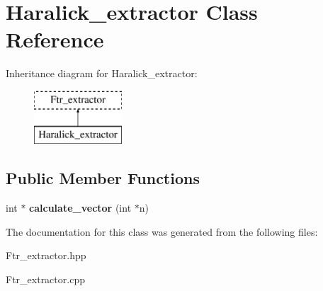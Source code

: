 \hypertarget{class_haralick__extractor}{\section{Haralick\+\_\+extractor Class Reference}
\label{class_haralick__extractor}
}
Inheritance diagram for Haralick\+\_\+extractor\+:\begin{figure}[H]
\begin{center}
\leavevmode
\includegraphics[height=2.000000cm]{class_haralick__extractor}
\end{center}
\end{figure}
\subsection*{Public Member Functions}
\begin{DoxyCompactItemize}
\item 
\hypertarget{class_haralick__extractor_a11fcc043c9abe6d00ae337ea7f5048f9}{int $\ast$ {\bfseries calculate\+\_\+vector} (int $\ast$n)}\label{class_haralick__extractor_a11fcc043c9abe6d00ae337ea7f5048f9}

\end{DoxyCompactItemize}


The documentation for this class was generated from the following files\+:\begin{DoxyCompactItemize}
\item 
Ftr\+\_\+extractor.\+hpp\item 
Ftr\+\_\+extractor.\+cpp\end{DoxyCompactItemize}
